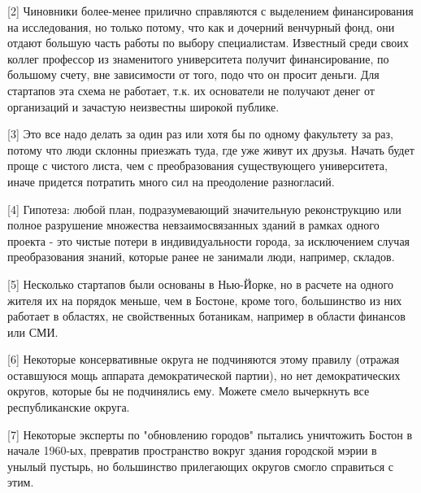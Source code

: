 \documentclass[ebook,12pt,oneside,openany]{memoir}
\begin{document}
[2] Чиновники более-менее прилично справляются с выделением
финансирования на исследования, но только потому, что как и дочерний
венчурный фонд, они отдают большую часть работы по выбору
специалистам. Известный среди своих коллег профессор из знаменитого
университета получит финансирование, по большому счету, вне
зависимости от того, подо что он просит деньги. Для стартапов эта
схема не работает, т.к. их основатели не получают денег от организаций
и зачастую неизвестны широкой публике.

[3] Это все надо делать за один раз или хотя бы по одному факультету
за раз, потому что люди склонны приезжать туда, где уже живут их
друзья. Начать будет проще с чистого листа, чем с преобразования
существующего университета, иначе придется потратить много сил на
преодоление разногласий.

[4] Гипотеза: любой план, подразумевающий значительную реконструкцию
или полное разрушение множества невзаимосвязанных зданий в рамках
одного проекта - это чистые потери в индивидуальности города, за
исключением случая преобразования знаний, которые ранее не занимали
люди, например, складов.

[5] Несколько стартапов были основаны в Нью-Йорке, но в расчете на
одного жителя их на порядок меньше, чем в Бостоне, кроме того,
большинство из них работает в областях, не свойственных ботаникам,
например в области финансов или СМИ.

[6] Некоторые консервативные округа не подчиняются этому правилу
(отражая оставшуюся мощь аппарата демократической партии), но нет
демократических округов, которые бы не подчинялись ему. Можете смело
вычеркнуть все республиканские округа.

[7] Некоторые эксперты по "обновлению городов" пытались уничтожить
Бостон в начале 1960-ых, превратив пространство вокруг здания
городской мэрии в унылый пустырь, но большинство прилегающих округов
смогло справиться с этим.
\end{document}
